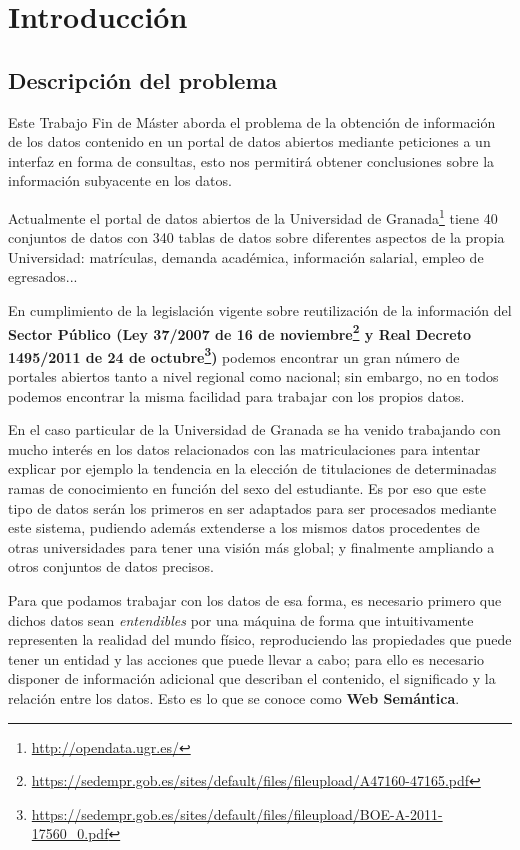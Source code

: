 \chapter{Introducción}

\section{Descripción del problema}

Este {\sf Trabajo Fin de Máster} aborda el problema de la obtención de información de los datos contenido en un portal de datos abiertos mediante peticiones a un interfaz en forma de consultas, esto nos permitirá obtener conclusiones sobre la información subyacente en los datos.

\bigskip
Actualmente el portal de datos abiertos de la {\sf Universidad de Granada}\footnote{\url{http://opendata.ugr.es/}} tiene 40 conjuntos de datos con 340 tablas de datos sobre diferentes aspectos de la propia Universidad: matrículas, demanda académica, información salarial, empleo de egresados...

\bigskip
En cumplimiento de la legislación vigente sobre reutilización de la información del \textbf{Sector Público (Ley 37/2007 de 16 de noviembre\footnote{\url{https://sedempr.gob.es/sites/default/files/fileupload/A47160-47165.pdf}} y Real Decreto 1495/2011 de 24 de octubre\footnote{\url{https://sedempr.gob.es/sites/default/files/fileupload/BOE-A-2011-17560\_0.pdf}})} podemos encontrar un gran número de portales abiertos tanto a nivel regional como nacional; sin embargo, no en todos podemos encontrar la misma facilidad para trabajar con los propios datos.

\bigskip
En el caso particular de la {\sf Universidad de Granada} se ha venido trabajando con mucho interés en los datos relacionados con las matriculaciones para intentar explicar por ejemplo la tendencia en la elección de titulaciones de determinadas ramas de conocimiento en función del sexo del estudiante. Es por eso que este tipo de datos serán los primeros en ser adaptados para ser procesados mediante este sistema, pudiendo además extenderse a los mismos datos procedentes de otras universidades para tener una visión más global; y finalmente ampliando a otros conjuntos de datos precisos. 

\newpage
Para que podamos trabajar con los datos de esa forma, es necesario primero que dichos datos sean \textit{entendibles} por una máquina de forma que intuitivamente representen la realidad del mundo físico, reproduciendo las propiedades que puede tener un entidad y las acciones que puede llevar a cabo; para ello es necesario disponer de información adicional que describan el contenido, el significado y la relación entre los datos. Esto es lo que se conoce como \textbf{Web Semántica}.

